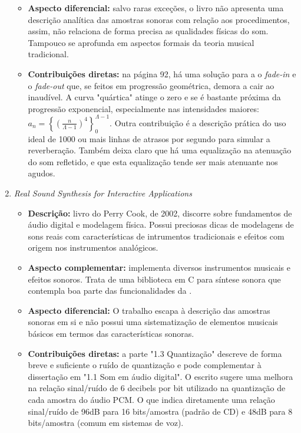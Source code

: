 \begin{enumerate}
\begin{itemize}
            \item {\bf Aspecto diferencial:} salvo raras exceções, o livro não apresenta uma descrição analítica das amostras sonoras com relação aos procedimentos, assim, não relaciona de forma precisa as qualidades físicas do som. Tampouco se aprofunda em aspectos formais da teoria musical tradicional.
            \item {\bf Contribuições diretas:} na página 92, há uma solução para a o \emph{fade-in} e o \emph{fade-out} que, se feitos em progressão geométrica, demora a cair ao inaudível. A curva "quártica" atinge o zero e se é bastante próxima da progressão exponencial, especialmente nas intensidades maiores: $a_n = \left\{\left(\frac{n}{\Lambda-1}\right)^4\right\}_0^{\Lambda-1}$. Outra contribuição é a descrição prática do uso ideal de 1000 ou mais linhas de atrasos por segundo para simular a reverberação. Também deixa claro que há uma equalização na atenuação do som refletido, e que esta equalização tende ser mais atenuante nos agudos.
        \end{itemize}
    \item \emph{Real Sound Synthesis for Interactive Applications}
        \begin{itemize}
            \item {\bf Descrição:} livro do Perry Cook, de 2002, discorre sobre fundamentos de áudio digital e modelagem física. Possui preciosas dicas de modelagens de sons reais com características de intrumentos tradicionais e efeitos com origem nos instrumentos analógicos.
            \item {\bf Aspecto complementar:} implementa diversos instrumentos musicais e efeitos sonoros. Trata de uma biblioteca em C para síntese sonora que contempla boa parte das funcionalidades da \massa.
            \item {\bf Aspecto diferencial:} O trabalho escapa à descrição das amostras sonoras em si e não possui uma sistematização de elementos musicais básicos em termos das características sonoras.
            \item {\bf Contribuições diretas:}  a parte "1.3 Quantização" descreve de forma breve e suficiente o ruído de quantização e pode complementar à dissertação em "1.1 Som em áudio digital". O escrito sugere uma melhora na relação sinal/ruído de 6 decibels por bit utilizado na quantização de cada amostra do áudio PCM. O que indica diretamente uma relação sinal/ruído de 96dB para 16 bits/amostra (padrão de CD) e 48dB para 8 bits/amostra (comum em sistemas de voz).
        \end{itemize}

\end{enumerate}
